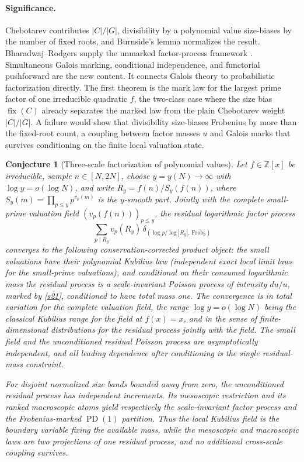 \documentclass[11pt]{article}
\newtheorem{conjecture}{Conjecture}
\theoremstyle{definition}
\newcommand{\PD}{\operatorname{PD}}
\newcommand{\Z}{\mathbb Z}
\providecommand{\Z}{\mathbb Z}
\begin{document}
\paragraph{Significance.}
Chebotarev contributes $|C|/|G|$, divisibility by a polynomial value size-biases by the
number of fixed roots, and Burnside's lemma normalizes the result.  Bharadwaj--Rodgers
supply the unmarked factor-process framework \cite{BR}.  Simultaneous Galois marking,
conditional independence, and functorial pushforward are the new content.  It connects Galois theory to probabilistic factorization directly. The first theorem is the mark law for the largest prime factor of one irreducible quadratic $f$, the two-class case where the size bias $\operatorname{fix}(C)$ already separates the marked law from the plain Chebotarev weight $|C|/|G|$. A failure would show that divisibility size-biases Frobenius by more than the fixed-root count, a coupling between factor masses $u$ and Galois marks that survives conditioning on the finite local valuation state.

\begin{conjecture}[Three-scale factorization of polynomial values]\label{s22}
Let $f\in\Z[x]$ be irreducible, sample $n\in[N,2N]$, choose
$y=y(N)\to\infty$ with $\log y=o(\log N)$, and write
$R_y=f(n)/S_y(f(n))$, where $S_y(m)=\prod_{p\le y}p^{v_p(m)}$ is the $y$-smooth
part.  Jointly with the complete small-prime valuation field
$(v_p(f(n)))_{p\le y}$, the residual logarithmic factor process
\[
 \sum_{p\mid R_y}v_p(R_y)\,
 \delta_{\left(\log p/\log|R_y|,\,\mathrm{Frob}_p\right)}
\]
converges to the following conservation-corrected product object: the small valuations
have their polynomial Kubilius law (independent exact local limit laws for the small-prime valuations), and conditional on their consumed logarithmic mass
the residual process is a scale-invariant Poisson process of intensity $du/u$, marked by
\cref{s21}, conditioned to have total mass one.  The convergence is in total variation for the complete valuation field, the range $\log y=o(\log N)$ being the classical Kubilius range for the field at $f(x)=x$, and in the sense of finite-dimensional distributions for the residual process jointly with the field.  The small field and the unconditioned
residual Poisson process are asymptotically independent, and all leading dependence
after conditioning is the single residual-mass constraint.

For disjoint normalized size bands bounded away from zero, the unconditioned residual
process has independent increments.  Its mesoscopic restriction and its ranked
macroscopic atoms yield respectively the scale-invariant factor process and the
Frobenius-marked $\PD(1)$ partition.  Thus the local Kubilius field is the boundary
variable fixing the available mass, while the mesoscopic and macroscopic laws are two
projections of one residual process, and no additional cross-scale coupling survives.
\end{conjecture}
\end{document}
